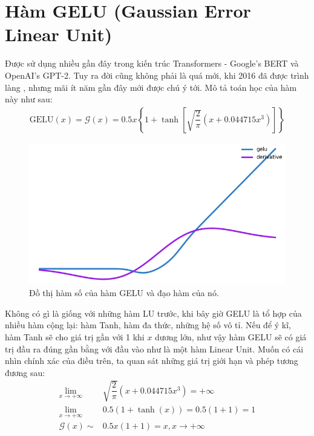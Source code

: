 \section{Hàm GELU (Gaussian Error Linear Unit)}\label{sec:hamgelu}

Được sử dụng nhiều gần đây trong kiến trúc Transformers - Google's BERT và OpenAI's GPT-2.
Tuy ra đời cũng không phải là quá mới, khi 2016 đã được trình làng \cite{hendrycks2020gaussian}, nhưng mãi ít năm gần đây mới được chú ý tới.
Mô tả toán học của hàm này như sau:
\begin{align}
    \text{GELU}(x) = \mathcal{G}(x) = 0.5x\left\{1 + \tanh\left[\sqrt{\dfrac{2}{\pi}}\left(x + 0.044715x^3\right)\right]\right\}
\end{align}

\begin{figure}[!h]
\captionsetup{width=0.8\textwidth}
\centering
\includegraphics[width=15cm]{images/gelu.PNG}
\caption{Đồ thị hàm số của hàm GELU và đạo hàm của nó.}
\label{fig:gelufunc}
\end{figure}

Không có gì là giống với những hàm LU trước, khi bây giờ GELU là tổ hợp của nhiều hàm cộng lại: hàm Tanh, hàm đa thức, những hệ số vô tỉ.
Nếu để ý kĩ, hàm Tanh sẽ cho giá trị gần với 1 khi $x$ dương lớn, như vậy hàm GELU sẽ có giá trị đầu ra đúng gần bằng với đầu vào như là một hàm Linear Unit.
Muốn có cái nhìn chính xác của điều trên, ta quan sát những giá trị giới hạn và phép tương đương sau:
\begin{align}
\lim_{x \rightarrow +\infty}&\sqrt{\dfrac{2}{\pi}}\left(x + 0.044715x^3\right) = +\infty\\
\lim_{x \rightarrow +\infty}&0.5\left(1 + \tanh(x)\right) = 0.5\left(1 + 1\right) = 1\\
\mathcal{G}(x) \sim & 0.5x\left(1 + 1\right) = x, x \rightarrow +\infty
\end{align}

